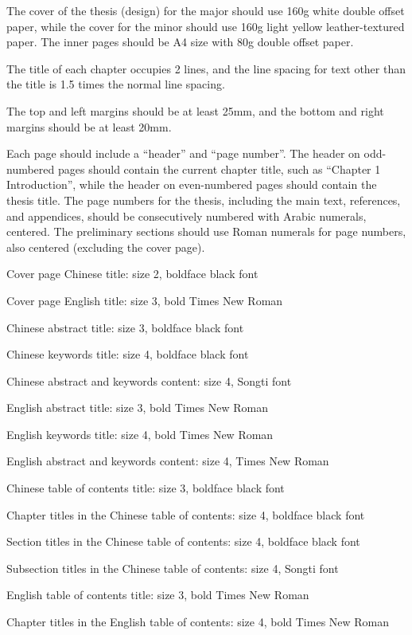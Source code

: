\documentclass{xmu}
\begin{document}
\begin{appendix}
    The cover of the thesis (design) for the major should use 160g white double offset paper, while the cover for the minor should use 160g light yellow leather-textured paper. The inner pages should be A4 size with 80g double offset paper.

    The title of each chapter occupies 2 lines, and the line spacing for text other than the title is 1.5 times the normal line spacing.

    The top and left margins should be at least 25mm, and the bottom and right margins should be at least 20mm.

    Each page should include a ``header'' and ``page number''. The header on odd-numbered pages should contain the current chapter title, such as ``Chapter 1 Introduction'', while the header on even-numbered pages should contain the thesis title. The page numbers for the thesis, including the main text, references, and appendices, should be consecutively numbered with Arabic numerals, centered. The preliminary sections should use Roman numerals for page numbers, also centered (excluding the cover page).

    Cover page Chinese title: size 2, boldface black font

    Cover page English title: size 3, bold Times New Roman

    Chinese abstract title: size 3, boldface black font

    Chinese keywords title: size 4, boldface black font

    Chinese abstract and keywords content: size 4, Songti font

    English abstract title: size 3, bold Times New Roman

    English keywords title: size 4, bold Times New Roman

    English abstract and keywords content: size 4, Times New Roman

    Chinese table of contents title: size 3, boldface black font

    Chapter titles in the Chinese table of contents: size 4, boldface black font

    Section titles in the Chinese table of contents: size 4, boldface black font

    Subsection titles in the Chinese table of contents: size 4, Songti font

    English table of contents title: size 3, bold Times New Roman

    Chapter titles in the English table of contents: size 4, bold Times New Roman


\end{appendix}
\end{document}
